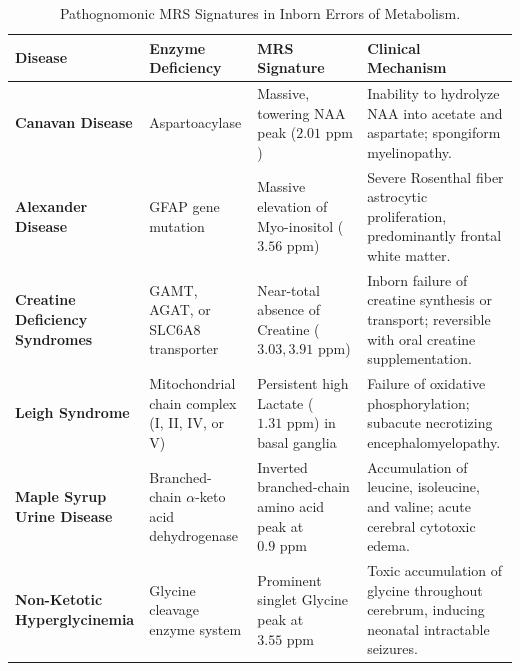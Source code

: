 \documentclass[11pt,a4paper]{article}
\begin{document}
\begin{table}[htbp]
\centering
\small
\setlength{\tabcolsep}{2.5pt}
\caption{Pathognomonic MRS Signatures in Inborn Errors of Metabolism.}
\label{tab:inborn_errors}
\begin{tabular}{p{3.2cm} p{2.8cm} p{3.4cm} p{4.6cm}}
\toprule
\textbf{Disease} & \textbf{Enzyme Deficiency} & \textbf{MRS Signature} & \textbf{Clinical Mechanism} \\
\midrule
\textbf{Canavan Disease} & Aspartoacylase & Massive, towering NAA peak ($2.01\text{ ppm}$) & Inability to hydrolyze NAA into acetate and aspartate; spongiform myelinopathy. \\
\addlinespace
\textbf{Alexander Disease} & GFAP gene mutation & Massive elevation of Myo-inositol ($3.56\text{ ppm}$) & Severe Rosenthal fiber astrocytic proliferation, predominantly frontal white matter. \\
\addlinespace
\textbf{Creatine Deficiency Syndromes} & GAMT, AGAT, or SLC6A8 transporter & Near-total absence of Creatine ($3.03, 3.91\text{ ppm}$) & Inborn failure of creatine synthesis or transport; reversible with oral creatine supplementation. \\
\addlinespace
\textbf{Leigh Syndrome} & Mitochondrial chain complex (I, II, IV, or V) & Persistent high Lactate ($1.31\text{ ppm}$) in basal ganglia & Failure of oxidative phosphorylation; subacute necrotizing encephalomyelopathy. \\
\addlinespace
\textbf{Maple Syrup Urine Disease} & Branched-chain $\alpha$-keto acid dehydrogenase & Inverted branched-chain amino acid peak at $0.9\text{ ppm}$ & Accumulation of leucine, isoleucine, and valine; acute cerebral cytotoxic edema. \\
\addlinespace
\textbf{Non-Ketotic Hyperglycinemia} & Glycine cleavage enzyme system & Prominent singlet Glycine peak at $3.55\text{ ppm}$ & Toxic accumulation of glycine throughout cerebrum, inducing neonatal intractable seizures. \\
\bottomrule
\end{tabular}
\end{table}
\end{document}
